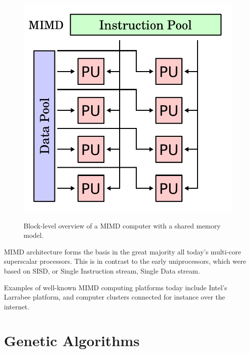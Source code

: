 \begin{figure}[H]
\begin{center}
    \includegraphics[width=\textwidth/2]{fig/mimd-block-diagram.pdf}
    \label{figure:mimd-block-diagram}
    \caption[
    Block-level overview of a MIMD computer with a shared memory model
    ]{
    Block-level overview of a MIMD computer with a shared memory model.
   }
\end{center}
\end{figure}

MIMD architecture forms the basis in the great majority all today’s multi-core superscalar processors.
This is in contrast to the early uniprocessors, which were based on SISD, or Single Instruction stream, Single Data stream. 


Examples of well-known MIMD computing platforms today include Intel's Larrabee platform, and computer clusters connected for instance over the internet.

\section{Genetic Algorithms}
\label{ga-algorithms}

